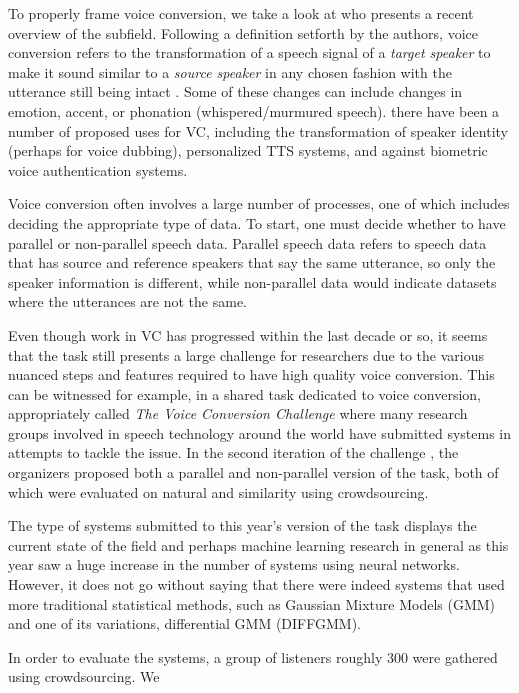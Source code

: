 \documentclass
[
    a4paper,
    twoside,
    12pt
]
{report}
\begin{document}
To properly frame voice conversion, we take a look at
\cite{mohammadi2017} who presents a recent overview of the subfield.
Following a definition setforth by the authors, voice conversion refers
to the transformation of a speech signal of a \emph{target speaker} to
make it sound similar to a \emph{source speaker} in any chosen fashion
with the utterance still being intact \cite{mohammadi2017}. Some of
these changes can include changes in emotion, accent, or phonation
(whispered/murmured speech). there have been a number of proposed uses
for VC, including the transformation of speaker identity (perhaps for
voice dubbing), personalized TTS systems, and against biometric voice
authentication systems.

Voice conversion often involves a large number of processes, one of
which includes deciding the appropriate type of data. To start, one must
decide whether to have parallel or non-parallel speech data. Parallel
speech data refers to speech data that has source and reference speakers
that say the same utterance, so only the speaker information is
different, while non-parallel data would indicate datasets where the
utterances are not the same.

Even though work in VC has progressed within the last decade or so, it
seems that the task still presents a large challenge for researchers due
to the various nuanced steps and features required to have high quality
voice conversion. This can be witnessed for example, in a shared task
dedicated to voice conversion, appropriately called \emph{The Voice
Conversion Challenge} where many research groups involved in speech
technology around the world have submitted systems in attempts to tackle
the issue. In the second iteration of the challenge
\cite{lorenzo-trueba2018}, the organizers proposed both a parallel and
non-parallel version of the task, both of which were evaluated on
natural and similarity using crowdsourcing.

The type of systems submitted to this year's version of the task
displays the current state of the field and perhaps machine learning
research in general as this year saw a huge increase in the number of
systems using neural networks. However, it does not go without saying
that there were indeed systems that used more traditional statistical
methods, such as Gaussian Mixture Models (GMM) and one of its
variations, differential GMM (DIFFGMM).

In order to evaluate the systems, a group of listeners roughly 300 were
gathered using crowdsourcing. We
\end{document}
